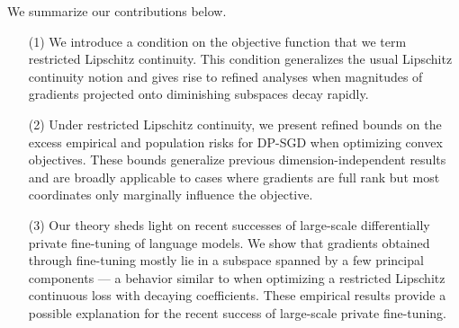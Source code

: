 We summarize our contributions below.
\begin{itemize}[leftmargin=7mm]
\setlength\itemsep{0.1em}
	\item [(1)] We introduce a condition on the objective function that we term restricted Lipschitz continuity.
		This condition generalizes the usual Lipschitz continuity notion and gives rise to refined analyses when magnitudes of gradients projected onto diminishing subspaces decay rapidly.
	\item [(2)] Under restricted Lipschitz continuity, we present refined bounds on the excess empirical and population risks for DP-SGD when optimizing convex objectives. These bounds generalize previous dimension-independent results~\cite{song2021evading} and are broadly applicable to cases where gradients are full rank but most coordinates only marginally influence the objective.
	\item [(3)] Our theory sheds light on recent successes of large-scale differentially private fine-tuning of language models.
		We show that gradients obtained through fine-tuning mostly lie in a subspace spanned by a few principal components --- a behavior similar to when optimizing a restricted Lipschitz continuous loss with decaying coefficients.
		These empirical results provide a possible explanation for the recent success of large-scale private fine-tuning.
\end{itemize}
